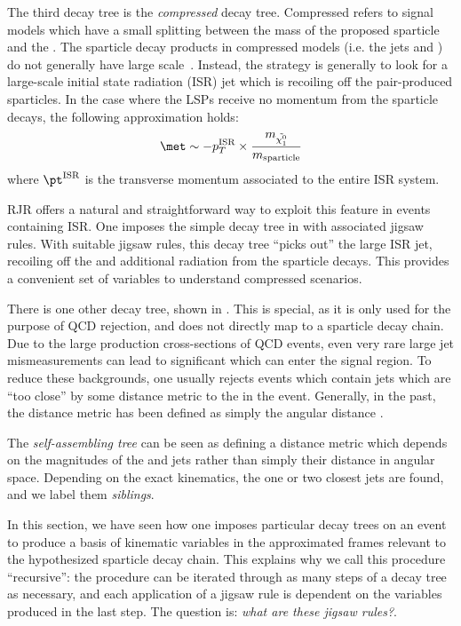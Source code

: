 The third decay tree  is the \textit{compressed} decay tree.
Compressed refers to signal models which have a small splitting between the mass of the proposed sparticle and the \lsp.
The sparticle decay products in compressed models (i.e. the jets and \met) do not generally have large scale~\cite{Jackson:2016mfb}.
Instead, the strategy is generally to look for a large-scale initial state radiation (ISR) jet which is recoiling off the pair-produced sparticles.
In the case where the LSPs receive no momentum from the sparticle decays, the following approximation holds:
\begin{align}
\met \order -p_T^{\text{ISR}} \times \frac{m_{\lsp} }{m_{\text{sparticle}}}
\end{align}
where $\pt^{\text{ISR}}$ is the transverse momentum associated to the entire ISR system.

RJR offers a natural and straightforward way to exploit this feature in events containing ISR.
One imposes the simple decay tree in  with associated jigsaw rules.
With suitable jigsaw rules, this decay tree ``picks out'' the large \pt ISR jet, recoiling off the \met and additional radiation from the sparticle decays.
This provides a convenient set of variables to understand compressed scenarios.

There is one other decay tree, shown in .
This is special, as it is only used for the purpose of QCD rejection, and does not directly map to a sparticle decay chain.
Due to the large production cross-sections of QCD events, even very rare large jet mismeasurements can lead to significant \met which can enter the signal region.
To reduce these backgrounds, one usually rejects events which contain jets which are ``too close'' by some distance metric to the \met in the event.
Generally, in the past, the distance metric has been defined as simply the angular distance \deltaR.

The \textit{self-assembling tree} can be seen as defining a distance metric which depends on the magnitudes of the \met and jets rather than simply their distance in angular space.
Depending on the exact kinematics, the one or two closest jets are found, and we label them \met \textit{siblings}.

In this section, we have seen how one imposes particular decay trees on an event to produce a basis of kinematic variables in the approximated frames relevant to the hypothesized sparticle decay chain.
This explains why we call this procedure ``recursive'': the procedure can be iterated through as many steps of a decay tree as necessary, and each application of a jigsaw rule is dependent on the variables produced in the last step.
The question is: \textit{what are these jigsaw rules?}.

